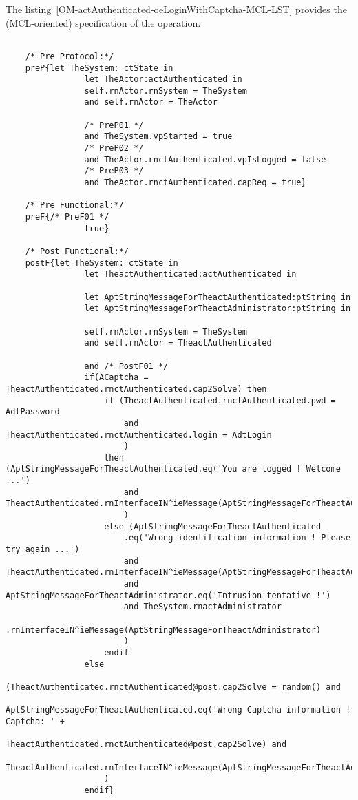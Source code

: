 	\vspace{1cm}
	The listing~\ref{OM-actAuthenticated-oeLoginWithCaptcha-MCL-LST} provides the \msrmessir (MCL-oriented) specification of the operation.
	
	\scriptsize
	\vspace{0.5cm}
	\begin{lstlisting}[style=MessirStyle,firstnumber=auto,captionpos=b,caption={\msrmessir (MCL-oriented) specification of the operation \emph{oeLoginWithCaptcha}.},label=OM-actAuthenticated-oeLoginWithCaptcha-MCL-LST]

	/* Pre Protocol:*/ 
	preP{let TheSystem: ctState in
				let TheActor:actAuthenticated in
				self.rnActor.rnSystem = TheSystem
				and self.rnActor = TheActor
				
				/* PreP01 */
				and TheSystem.vpStarted = true
				/* PreP02 */
				and TheActor.rnctAuthenticated.vpIsLogged = false
				/* PreP03 */
				and TheActor.rnctAuthenticated.capReq = true}
	
	/* Pre Functional:*/
	preF{/* PreF01 */
				true}
	
	/* Post Functional:*/ 
	postF{let TheSystem: ctState in
				let TheactAuthenticated:actAuthenticated in
				
				let AptStringMessageForTheactAuthenticated:ptString in
				let AptStringMessageForTheactAdministrator:ptString in
				
				self.rnActor.rnSystem = TheSystem
				and self.rnActor = TheactAuthenticated
				
				and /* PostF01 */
				if(ACaptcha = TheactAuthenticated.rnctAuthenticated.cap2Solve) then
					if (TheactAuthenticated.rnctAuthenticated.pwd = AdtPassword
						and TheactAuthenticated.rnctAuthenticated.login = AdtLogin
						)
					then (AptStringMessageForTheactAuthenticated.eq('You are logged ! Welcome ...')
						and TheactAuthenticated.rnInterfaceIN^ieMessage(AptStringMessageForTheactAuthenticated)
						)
					else (AptStringMessageForTheactAuthenticated
						.eq('Wrong identification information ! Please try again ...')
						and TheactAuthenticated.rnInterfaceIN^ieMessage(AptStringMessageForTheactAuthenticated)
						and AptStringMessageForTheactAdministrator.eq('Intrusion tentative !')
						and TheSystem.rnactAdministrator
						.rnInterfaceIN^ieMessage(AptStringMessageForTheactAdministrator)
						)
					endif
				else
					(TheactAuthenticated.rnctAuthenticated@post.cap2Solve = random() and
						AptStringMessageForTheactAuthenticated.eq('Wrong Captcha information ! Captcha: ' +
							TheactAuthenticated.rnctAuthenticated@post.cap2Solve) and
						TheactAuthenticated.rnInterfaceIN^ieMessage(AptStringMessageForTheactAuthenticated)
					)
				endif}
	

\end{lstlisting}
